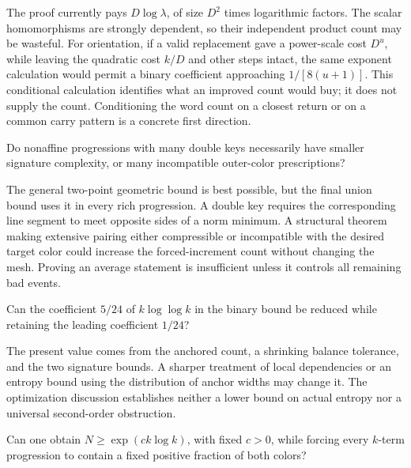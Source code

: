 The proof currently pays \(D\log\lambda\), of size
\(D^2\) times logarithmic factors.
The scalar homomorphisms are strongly dependent, so their independent
product count may be wasteful.
For orientation, if a valid replacement gave a power-scale cost
\(D^u\), while leaving the quadratic cost \(k/D\) and other steps
intact, the same exponent calculation would permit a binary
coefficient approaching \(1/[8(u+1)]\).
This conditional calculation identifies what an improved count would
buy; it does not supply the count.
Conditioning the word count on a closest return or on a common
carry pattern is a concrete first direction.

\begin{question}\label{q:keys}
Do nonaffine progressions with many double keys necessarily have
smaller signature complexity, or many incompatible outer-color
prescriptions?
\end{question}

The general two-point geometric bound is best possible, but the final
union bound uses it in every rich progression.
A double key requires the corresponding line segment to meet opposite
sides of a norm minimum. A structural theorem making extensive pairing
either compressible or incompatible with the desired target color
could increase the forced-increment count without changing the mesh.
Proving an average statement is insufficient unless it controls all
remaining bad events.

\begin{question}\label{q:log}
Can the coefficient \(5/24\) of \(k\log\log k\) in the binary bound
be reduced while retaining the leading coefficient \(1/24\)?
\end{question}

The present value comes from the anchored count, a shrinking balance
tolerance, and the two signature bounds.
A sharper treatment of local dependencies or an entropy bound using
the distribution of anchor widths may change it.
The optimization discussion establishes neither a lower bound on
actual entropy nor a universal second-order obstruction.

\begin{question}\label{q:robust}
Can one obtain \(N\ge\exp(c k\log k)\), with fixed \(c>0\), while
forcing every \(k\)-term progression to contain a fixed positive
fraction of both colors?
\end{question}


